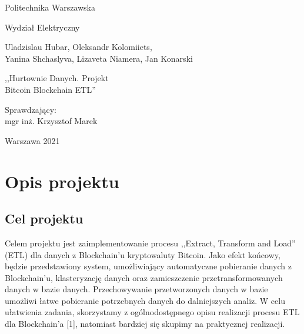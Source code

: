 \documentclass[12pt,oneside,a4paper]{book}
\begin{document}
\thispagestyle{empty}
\begin{center}{\sc \Large
Politechnika Warszawska\\}\par\vspace{0.2cm}\par
{\large
Wydział Elektryczny
}
\end{center}
\vspace{5cm}
\begin{center}
{
Uladzislau Hubar, Oleksandr Kolomiiets,\\Yanina Shchaslyva, Lizaveta Niamera, Jan Konarski
}\par\vspace{1 cm}\par
{\LARGE
,,Hurtownie Danych. Projekt\\Bitcoin Blockchain ETL''
}
\end{center}
\vspace{4cm}
\begin{flushright}
Sprawdzający:\\
mgr inż. Krzysztof Marek
\end{flushright}
\vfill
\begin{center}
Warszawa 2021
\end{center}

\thispagestyle{empty} \setcounter{page}{0}

\tableofcontents

\thispagestyle{empty} \setcounter{page}{1}

\newpage

\chapter{Opis projektu}

\section{Cel projektu}
Celem projektu jest zaimplementowanie procesu ,,Extract, Transform and Load'' (ETL) dla danych z Blockchain'u kryptowaluty Bitcoin. Jako efekt końcowy, będzie przedstawiony system, umożliwiający automatyczne pobieranie danych z Blockchain'u, klasteryzację danych oraz zamieszczenie przetransformowanych danych w bazie danych. Przechowywanie przetworzonych danych w bazie umożliwi łatwe pobieranie potrzebnych danych do dalniejszych analiz.
\newline \newline
W celu ułatwienia zadania, skorzystamy z ogólnodostępnego opisu realizacji procesu ETL dla Blockchain'a [1], natomiast bardziej się skupimy na praktycznej realizacji.
\end{document}
